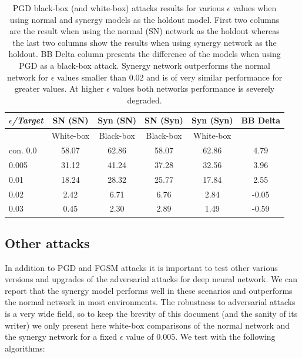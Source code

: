 \documentclass[b5paper]{book}
\begin{document}
\begin{table}[ht]
  \centering
  \begin{tabular}{l|cc|cc|c}
    \toprule
     \textit{\(\epsilon\)/Target} & {SN (SN)} & {Syn (SN)} & {SN (Syn)} & {Syn (Syn)} & BB Delta \\
    \midrule
    {} & {White-box} & {Black-box} & {Black-box} & {White-box} & {} \\
    \midrule
    {con. 0.0} & {58.07} & {62.86}  & {58.07} & {62.86} & {4.79} \\
    {0.005} & {31.12} & {41.24}  & {37.28} & {32.56} & {3.96} \\
    {0.01} & {18.24} & {28.32}  & {25.77} & {17.84} & {2.55} \\
    {0.02} & {2.42} & {6.71}  & {6.76} & {2.84} & {-0.05} \\
    {0.03} & {0.45} & {2.30}  & {2.89} & {1.49} & {-0.59} \\
    \bottomrule
  \end{tabular}
  \caption{PGD black-box (and white-box) attacks results for various \( \epsilon \) values when using normal and synergy models as the holdout model. First two columns are the result when using the normal (SN) network as the holdout whereas the last two columns show the results when using synergy network as the holdout. BB Delta column presents the difference of the models when using PGD as a black-box attack. Synergy network outperforms the normal network for \( \epsilon \) values smaller than 0.02 and is of very similar performance for greater values. At higher \( \epsilon \) values both networks performance is severely degraded.}
  \label{tab:results-pgd-synergy}
\end{table} 

\subsection{Other attacks}

In addition to PGD and FGSM attacks it is important to test other various versions and upgrades of the adversarial attacks for deep neural network. We can report that the synergy model performs well in these scenarios and outperforms the normal network in most environments. The robustness to adversarial attacks is a very wide field, so to keep the brevity of this document (and the sanity of its writer) we only present here white-box comparisons of the normal network and the synergy network for a fixed \( \epsilon \) value of \( 0.005 \). We test with the following algorithms:
\end{document}
